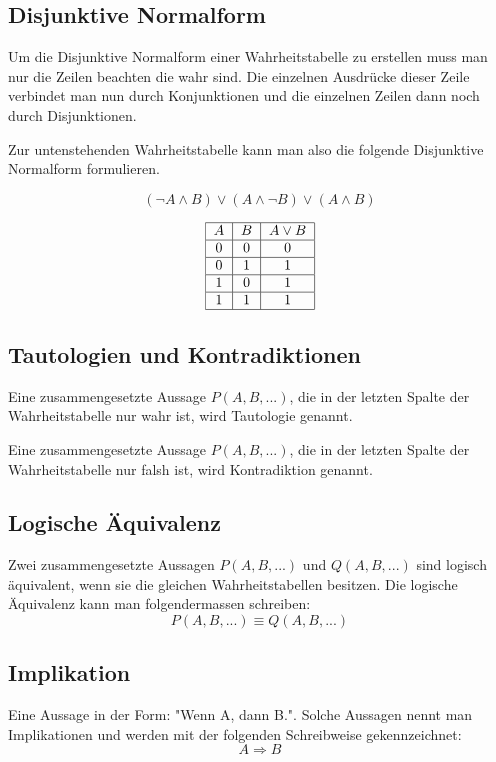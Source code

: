 \documentclass[12pt, a4paper, oneside]{article}
\begin{document}
\newpage
\subsection{Disjunktive Normalform}
Um die Disjunktive Normalform einer Wahrheitstabelle zu erstellen muss man nur die Zeilen beachten die wahr sind. Die einzelnen Ausdrücke dieser Zeile verbindet man nun durch Konjunktionen und die einzelnen Zeilen dann noch durch Disjunktionen. 

Zur untenstehenden Wahrheitstabelle kann man also die folgende Disjunktive Normalform formulieren.

\begin{equation*}
  (\lnot A \land B) \lor (A \land \lnot B) \lor (A \land B)
\end{equation*}

\begin{equation*}
  \begin{tabular}{|c|c|c|}
  \hline
  $A$ & $B$ & $A \lor B$ \\ \hline
  0 & 0 & 0 \\ \hline
  0 & 1 & 1 \\ \hline
  1 & 0 & 1 \\ \hline
  1 & 1 & 1 \\ \hline
  \end{tabular}
\end{equation*} 

\subsection{Tautologien und Kontradiktionen}
Eine zusammengesetzte Aussage $P(A, B,...)$, die in der letzten Spalte der Wahrheitstabelle nur wahr ist, wird Tautologie genannt.

Eine zusammengesetzte Aussage $P(A, B,...)$, die in der letzten Spalte der Wahrheitstabelle nur falsh ist, wird Kontradiktion genannt.
 
\subsection{Logische Äquivalenz}
Zwei zusammengesetzte Aussagen $P(A, B,...)$ und $Q(A, B,...)$ sind logisch äquivalent, wenn sie die gleichen Wahrheitstabellen besitzen. Die logische Äquivalenz kann man folgendermassen schreiben:
\begin{equation*} 
  P(A, B,...) \equiv Q(A, B,...)
\end{equation*}

\subsection{Implikation}
Eine Aussage in der Form: "Wenn A, dann B.". Solche Aussagen nennt man Implikationen und werden mit der folgenden Schreibweise gekennzeichnet:
\begin{equation*}
  A \Rightarrow B 
\end{equation*} 
\end{document}
